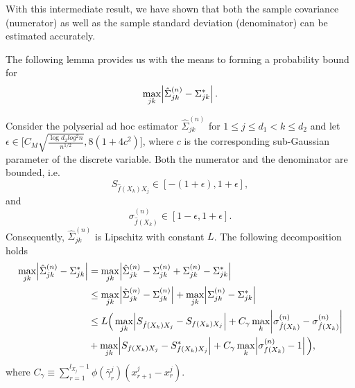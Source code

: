 With this intermediate result, we have shown that both the sample covariance (numerator) as well as the sample standard deviation (denominator) can be estimated accurately. 

The following lemma provides us with the means to forming a probability bound for 
\begin{equation*}
    \max_{jk}\abs{\hat{\Sigma}_{jk}^{(n)} -  \Sigma_{jk}^{*}}.
\end{equation*}


\begin{lemma}
    Consider the polyserial ad hoc estimator $\hat{\Sigma}_{jk}^{(n)}$ for $1 \leq j \leq d_1 < k \leq d_2$ and let $\epsilon \in \Big[ C_M\sqrt{\frac{\log d_2 log^2 n}{n^{1/2}}}, 8(1+4c^2)\Big]$, where $c$ is the corresponding sub-Gaussian parameter of the discrete variable. 
    Both the numerator and the denominator are bounded, i.e.
    \begin{equation*}
        S_{\hat{f}(X_k)X_j} \in [-(1 + \epsilon), 1 + \epsilon],
    \end{equation*}
    and 
    \begin{equation*}
        \sigma_{\hat{f}(X_k)}^{(n)} \in [1-\epsilon, 1+\epsilon].
    \end{equation*}
    Consequently, $\hat{\Sigma}_{jk}^{(n)}$ is Lipschitz with constant $L$. The following decomposition holds
    \begin{align*}
        \max_{jk}\abs{\hat{\Sigma}_{jk}^{(n)} -  \Sigma_{jk}^{*}} &=  \max_{jk}\abs{\hat{\Sigma}_{jk}^{(n)} - {\Sigma}_{jk}^{(n)} + {\Sigma}_{jk}^{(n)} - \Sigma_{jk}^{*}} \\
        &\leq \max_{jk}\abs{\hat{\Sigma}_{jk}^{(n)} - {\Sigma}_{jk}^{(n)}} + \max_{jk}\abs{{\Sigma}_{jk}^{(n)} - \Sigma_{jk}^{*}} \\
        &\leq L \Big( \max_{jk} \abs{S_{\hat{f}(X_k)X_j} - S_{{f}(X_k)X_j} } + C_\gamma \max_{k} \abs{\sigma_{\hat{f}(X_k)}^{(n)} - \sigma_{\hat{f}(X_k)}^{(n)} } \\
        &+  \max_{jk} \abs{S_{{f}(X_k)X_j} - S^*_{{f}(X_k)X_j}}  + C_\gamma \max_{k} \abs{\sigma^{(n)}_{{f}(X_k)} - 1} \Big),
    \end{align*}
    where $C_\gamma \equiv \sum_{r=1}^{l_{X_j}-1} \phi(\bar{\gamma}^j_r)(x^j_{r+1} - x^j_r)$.
\end{lemma}

